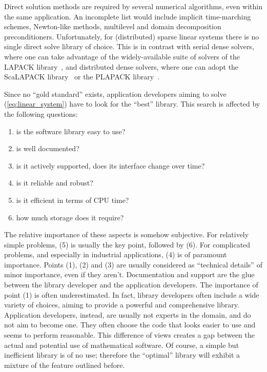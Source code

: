 \documentclass[acmtocl]{acmtrans2m}
\begin{document}
\smallskip

Direct solution methods are required by several numerical algorithms, even
within the same application. An
incomplete list would include implicit time-marching schemes, 
Newton-like methods, multilevel and domain decomposition preconditioners. 
Unfortunately, for (distributed) sparse linear systems there is no single direct
solve library of choice. This is in contrast with serial dense solvers, where
one can take advantage of the widely-available suite of solvers of the LAPACK 
library~\cite{lapack-guide}, and distributed dense solvers, where one can
adopt the ScaLAPACK library~\cite{scalapack-guide} or the PLAPACK
library~\cite{alpatov97plapack}. 

Since no ``gold standard'' exists, application developers aiming to solve
(\ref{eq:linear_system}) have to look
for the ``best'' library. This search is affected by the following questions:
\begin{enumerate}
\item is the software library easy to use?
\item is well documented?
\item is it actively supported, does its interface change over time?
\item is it reliable and robust?
\item is it efficient in terms of CPU time?
\item how much storage does it require?
\end{enumerate}
The relative importance of these aspects is somehow subjective. For relatively
simple problems, (5) is usually the key point, followed by (6). For
complicated problems, and especially in industrial applications, (4) is of
paramount importance. Points (1), (2) and (3) are usually considered as
``technical details'' of minor importance, even if they aren't. Documentation
and support are the glue between the library developer and the application
developers. The importance of point (1)
is often underestimated.  In fact, library developers often include a wide variety
of choices, aiming to provide a powerful and comprehensive library.
Application developers, instead, are usually not experts in the domain, and do
not aim to become one. They often choose the code that looks easier to use and
seems to perform reasonable. This difference of views creates a gap between
the actual and potential use of mathematical software.
Of course, a simple but inefficient library is of no use; therefore the
``optimal'' library will exhibit a mixture of the feature outlined before.
\end{document}
